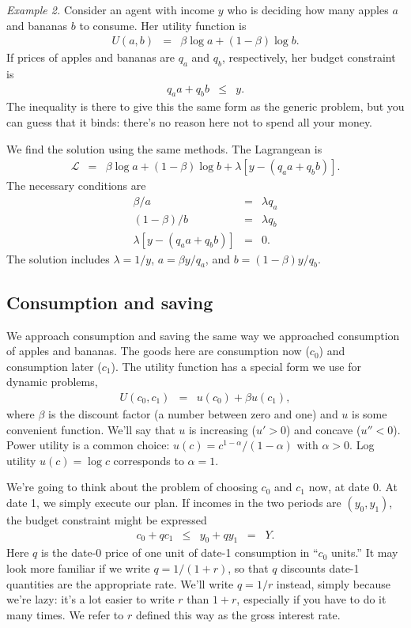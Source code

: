 \documentclass[11pt]{article}
\begin{document}
{\it Example 2.\/}
Consider an agent with income $y$ who is deciding
how many apples $a$ and bananas $b$ to consume.
Her utility function is
\begin{eqnarray*}
    U(a,b) &=& \beta \log a + (1-\beta) \log b .
\end{eqnarray*}
If prices of apples and bananas are $q_a$ and $q_b$,
respectively, her budget constraint is
\begin{eqnarray*}
    q_a a + q_b b  &\leq& y  .
\end{eqnarray*}
The inequality is there to give this the same form as the
generic problem, but you can guess that it binds:
there's no reason here not to spend all your money.

We find the solution using the same methods.
The Lagrangean is
\begin{eqnarray*}
    \mathcal{L} &=& \beta \log a + (1-\beta) \log b
            + \lambda \left[ y - (q_a a + q_b b) \right] .
\end{eqnarray*}
The necessary conditions are
\begin{eqnarray*}
        \beta / a &=& \lambda q_a \\
        (1-\beta) / b &=& \lambda q_b \\
   \lambda \left[ y - (q_a a + q_b b) \right] &=& 0 .
\end{eqnarray*}
The solution includes $\lambda = 1/y $,
$ a = \beta y/q_a $, and $b = (1-\beta) y /q_b $.


\subsection*{Consumption and saving}

We approach consumption and saving the same way we approached
consumption of apples and bananas.
The goods here are consumption now ($c_0$)
and consumption later ($c_1$).
The utility function has a special form we use for dynamic
problems,
\begin{eqnarray}
    U(c_0,c_1) &=& u(c_0) + \beta u(c_1) ,
    \label{eq:utility-2period}
\end{eqnarray}
where $\beta$ is the discount factor (a number between zero and one)
and $u$ is some convenient function.
We'll say that $u$ is increasing ($u' > 0$) and concave ($u'' < 0$).
Power utility is a common choice:
$u(c) = c^{1-\alpha}/(1-\alpha)$ with $\alpha > 0$.
Log utility $u(c) = \log c$ corresponds to $\alpha = 1$.

We're going to think about the problem of choosing
$c_0$ and $c_1$ now, at date 0.
At date 1, we simply execute our plan.
If incomes in the two periods are $(y_0,y_1)$,
the budget constraint might be expressed
\begin{eqnarray}
    c_0 + q c_1 &\leq& y_0 + q y_1  \;\;=\;\; Y .
    \label{eq:budget-2period}
\end{eqnarray}
Here $q$ is the date-0 price of one unit of date-1 consumption in ``$c_0$ units.''
It may look more familiar if we write $q = 1/(1+r)$, so that
$q$ discounts date-1 quantities are the appropriate rate.
We'll write $q = 1/r$ instead, simply because we're lazy:
it's a lot easier to write $r$ than $1+r$, especially if you have
to do it many times.
We refer to $r$ defined this way as the gross interest rate.
\end{document}
